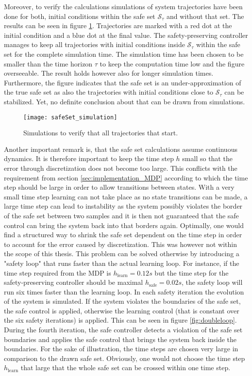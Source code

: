 \documentclass[../main.tex]{subfiles}
\begin{document}
Moreover, to verify the calculations simulations of system trajectories have been done for both, initial conditions within the safe set $\mathcal{S}_\tau$ and without that set. The results can be seen in figure \ref{fig:safeSet_simulation}. Trajectories are marked with a red dot at the initial condition and a blue dot at the final value. The safety-preserving controller manages to keep all trajectories with initial conditions inside $\mathcal{S}_\tau$ within the safe set for the complete simulation time. The simulation time has been chosen to be smaller than the time horizon $\tau$ to keep the computation time low and the figure overseeable. The result holds however also for longer simulation times. Furthermore, the figure indicates that the safe set is an under-approximation of the true safe set as also the trajectories with initial conditions close to $\mathcal{S}_\tau$ can be stabilized. Yet, no definite conclusion about that can be drawn from simulations. \par
\begin{figure}[h]
    \centering
    \texttt{[image: safeSet\_simulation]}
        \caption{Simulations to verify that all trajectories that start.}    
    \label{fig:safeSet_simulation}
\end{figure}
Another important remark is, that the safe set calculations assume continuous dynamics. It is therefore important to keep the time step $h$ small so that the error through discretization does not become too large. This conflicts with the requirement from section \ref{sec:implementation_MDP} according to which the time step should be large in order to allow transitions between states. With a very small time step learning can not take place as no state transitions can be made, a large time step can lead to instability as the system possibly violates the border of the safe set between two samples and it is then not guaranteed that the safe control can bring the system back into that borders again. Optimally, one would find a structured way to shrink the safe set dependent on the time step in order to account for the error caused by discretization. This was however not within the scope of this thesis. This problem can be solved otherwise by introducing a "safety loop" that runs faster than the actual learning loop. For instance, if the time step required from the MDP is $h_{\text{learn}} = 0.12s$ but the time step for the safety-preserving controller should be maximal $h_{\text{safe}} = 0.02s$, the safety loop will run six times faster than the learning loop. In each safety iteration the evolution of the system is simulated. If the system violates the boundaries of the safe set, the safe control is applied, otherwise the learning control (that is constant over the six safety iterations) is applied. This can be seen in figure \ref{fig:doubleloop}. During the fourth iteration, the safe controller detects a violation of the safe set boundaries and applies the safe control that brings the system back inside the boundaries. For the sake of illustration, the time steps are chosen very large in comparison to the drawn safe set. Obviously, one would not choose the time step $h_{\text{learn}}$ that large that the whole safe set can be crossed within one time step.
\end{document}
